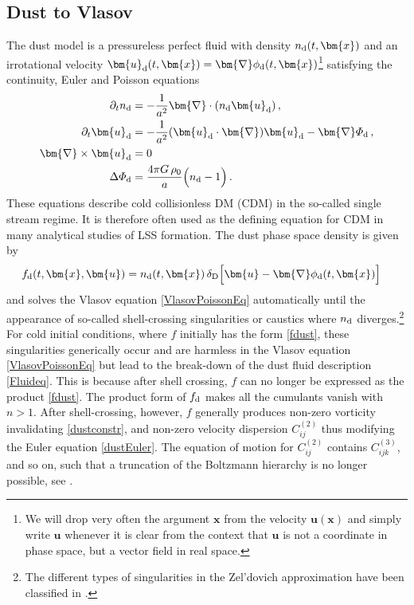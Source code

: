 \documentclass[twocolumn, nofootinbib, showpacs, superscriptaddress]{revtex4-1}
\renewcommand{\d}[0]{{\rm{d}}}
\newcommand{\del}[0]{\partial }
\newcommand{\vx}[0]{\bm{x} }
\newcommand{\vu}[0]{\bm{u} }
\newcommand{\vnabla}[0]{\bm{\nabla} }
\begin{document}
\subsection{Dust to Vlasov} \label{sec:DusttoVlasov}
The dust model is a  pressureless perfect fluid with density $n_{\rm d}(t,\vx)$ and an irrotational velocity $\vu_\d(t,\vx)=\vnabla \phi_{\rm d}(t,\vx)$\footnote{We will drop very often the argument $\vx$ from the velocity $\vu(\vx)$ and simply write $\vu$ whenever it is clear from the context that $\vu$ is not a coordinate in phase space, but a vector field in real space.}   satisfying the continuity, Euler and Poisson equations
\begin{subequations}\label{Fluideq}
\begin{align}
\del_t n_\d &= -\frac{1}{a^2}\vnabla \cdot(n_\d\vu_\d)  \label{Contidust}  \,,\\
\del_t \vu_\d &= -\frac{1}{a^2}(\vu_\d\cdot\vnabla)\vu_\d -\vnabla \varPhi_\d \,, \label{dustEuler}\\
\vnabla \times \vu_\d &= 0  \label{dustconstr}\\
\Delta \varPhi_\d&=\frac{4\pi G\,\rho_0}{a}\Big(n_\d -  1 \Big) \label{Poissdust}  \,.
\end{align}
\end{subequations}
These equations describe cold collisionless DM (CDM) in the so-called single stream regime.
It is therefore often used as the defining equation for CDM in many analytical studies of LSS formation. 
The dust phase space density is given by
\begin{align}
\label{fdust}
f_\d (t, \vx,\vu)&= n_\d(t, \vx)\, \delta_{\mathrm D}\Big[\vu-\vnabla \phi_\d(t,\vx) \Big] 
\end{align}
and solves the Vlasov equation \eqref{VlasovPoissonEq} automatically until the appearance of so-called shell-crossing singularities or caustics where $n_\d$ diverges.\footnote{The different types of singularities in the Zel'dovich approximation have been classified in \cite{ArnoldShandarinZeldovich1982}.} 
For cold initial conditions, where $f$ initially has the form \eqref{fdust}, these singularities generically occur and are harmless in the Vlasov equation \eqref{VlasovPoissonEq} but lead to the break-down of the dust fluid description  \eqref{Fluideq}.
This is because after shell crossing, $f$ can no longer be expressed  as the product \eqref{fdust}.
The product form of $f_\d$ makes all the cumulants vanish with $n>1$. After shell-crossing, however, $f$ generally produces non-zero vorticity 
invalidating \eqref{dustconstr}, and non-zero velocity dispersion $C^{(2)}_{ij}$ thus
 modifying the Euler equation \eqref{dustEuler}. The equation of motion for $C^{(2)}_{ij}$ contains $C^{(3)}_{ijk}$, and so on,
 such that a truncation of the Boltzmann hierarchy is no longer possible, see \cite{UhlemannKoppHaugg2014,PS09}. 
\end{document}
